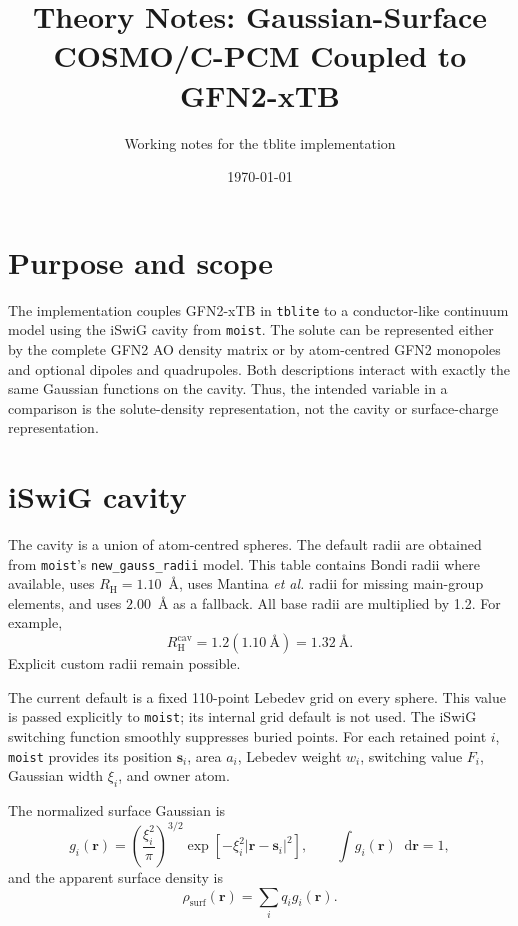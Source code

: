 \documentclass[11pt,a4paper]{article}
\title{Theory Notes: Gaussian-Surface COSMO/C-PCM Coupled to GFN2-xTB}
\author{Working notes for the tblite implementation}
\date{\today}
\newcommand{\vect}[1]{\bm{#1}}
\newcommand{\dd}{\mathop{}\!\mathrm{d}}
\begin{document}
\maketitle

\section{Purpose and scope}

The implementation couples GFN2-xTB in \texttt{tblite} to a conductor-like
continuum model using the iSwiG cavity from \texttt{moist}.  The solute can be
represented either by the complete GFN2 AO density matrix or by atom-centred
GFN2 monopoles and optional dipoles and quadrupoles.  Both descriptions interact
with exactly the same Gaussian functions on the cavity.  Thus, the intended
variable in a comparison is the solute-density representation, not the cavity
or surface-charge representation.

\section{iSwiG cavity}

The cavity is a union of atom-centred spheres.  The default radii are obtained
from \texttt{moist}'s \texttt{new\_gauss\_radii} model.  This table contains
Bondi radii where available, uses $R_{\mathrm H}=1.10$~\AA, uses Mantina
\emph{et al.} radii for missing main-group elements, and uses $2.00$~\AA{} as
a fallback.  All base radii are multiplied by 1.2.  For example,
\begin{equation}
 R_{\mathrm H}^{\mathrm{cav}}=1.2(1.10~\text{\AA})=1.32~\text{\AA}.
\end{equation}
Explicit custom radii remain possible.

The current default is a fixed 110-point Lebedev grid on every sphere.  This
value is passed explicitly to \texttt{moist}; its internal grid default is not
used.  The iSwiG switching function smoothly suppresses buried points.  For
each retained point $i$, \texttt{moist} provides its position $\vect{s}_i$,
area $a_i$, Lebedev weight $w_i$, switching value $F_i$, Gaussian width
$\xi_i$, and owner atom.

The normalized surface Gaussian is
\begin{equation}
 g_i(\vect{r})=
 \left(\frac{\xi_i^2}{\pi}\right)^{3/2}
 \exp[-\xi_i^2|\vect{r}-\vect{s}_i|^2],
 \qquad \int g_i(\vect{r})\dd\vect{r}=1,
 \label{eq:gi}
\end{equation}
and the apparent surface density is
\begin{equation}
 \rho_{\mathrm{surf}}(\vect{r})=\sum_i q_i g_i(\vect{r}).
\end{equation}
\end{document}
